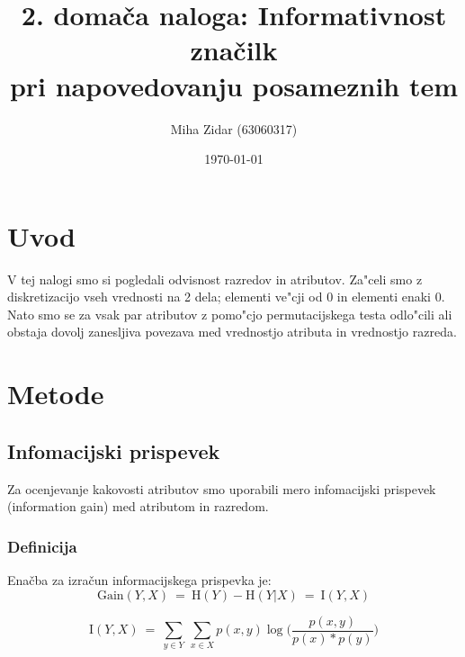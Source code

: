 \documentclass[a4paper,11pt]{article}
\title{2. domača naloga: Informativnost značilk\\pri napovedovanju posameznih tem}
\author{Miha Zidar (63060317)}
\date{\today}
\begin{document}
\maketitle

\section{Uvod}

V tej nalogi smo si pogledali odvisnost razredov in atributov. Za"celi smo z diskretizacijo vseh vrednosti na 2 dela; elementi ve"cji od 0 in elementi enaki 0. Nato smo se za vsak par atributov z pomo"cjo permutacijskega testa odlo"cili ali obstaja dovolj zanesljiva povezava med vrednostjo atributa in vrednostjo razreda. 

\section{Metode}
\subsection{Infomacijski prispevek}
Za ocenjevanje kakovosti atributov smo uporabili mero infomacijski prispevek (information gain) med atributom in razredom. 

\subsubsection*{Definicija}
Enačba za izračun informacijskega prispevka je:
\[\mbox{Gain}(Y,X)\ =\ \mbox{H}(Y) - \mbox{H}(Y|X)\ =\ \mbox{I}(Y,X)\]

\[\mbox{I}(Y,X)\ =\ \sum_{y\in Y}\ \sum_{x\in X} p(x,y) \log \Bigg(\frac{p(x,y)}{p(x)*p(y)}\Bigg) \]
\end{document}
